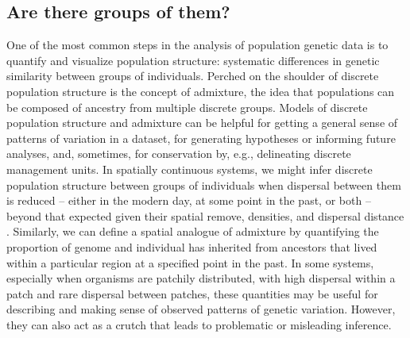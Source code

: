 \documentclass{ar-1col}
\begin{document}
\subsection{Are there groups of them?}
One of the most common steps in the analysis of population genetic data
is to quantify and visualize population structure:
systematic differences in genetic similarity between groups of individuals.
Perched on the shoulder of discrete population structure is the concept of admixture,
the idea that populations can be composed of ancestry from multiple discrete groups.
Models of discrete population structure and admixture 
\citep[e.g.,][]{STRUCTURE, ADMIXTURE}
can be helpful for getting a general sense of patterns of variation in a dataset, 
for generating hypotheses or informing future analyses, 
and, sometimes, for conservation by, 
e.g., delineating discrete management units.
In spatially continuous systems, 
we might infer discrete population structure between groups of individuals 
when dispersal between them is reduced -- 
either in the modern day, at some point in the past, or both -- 
beyond that expected given their spatial remove, densities, and dispersal distance
\citep{conStruct}.
Similarly, we can define a spatial analogue of admixture 
by quantifying the proportion of genome and individual 
has inherited from ancestors that lived within a particular region 
at a specified point in the past.
In some systems, 
especially when organisms are patchily distributed, 
with high dispersal within a patch and rare dispersal between patches,
these quantities may be useful for describing 
and making sense of observed patterns of genetic variation.
However, 
they can also act as a crutch that leads to problematic or misleading inference.
\end{document}
